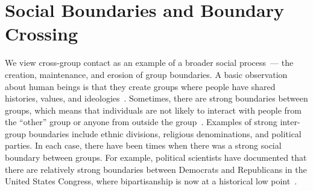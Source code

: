 \documentclass[letterpaper]{article}
\begin{document}


\section{Social Boundaries and Boundary Crossing}
We view cross-group contact as an example of a broader social process~--- the creation, maintenance, and erosion of group boundaries. A basic observation about human beings is that they create groups where people have shared histories, values, and ideologies~\cite{turner1987rediscovering}. Sometimes, there are strong boundaries between groups, which means that individuals are not likely to interact with people from the ``other'' group or anyone from outside the group~\cite{weisel2015groupconflict}. Examples of strong inter-group boundaries include ethnic divisions, religious denominations, and political parties. In each case, there have been times when there was a strong social boundary between groups. For example, political scientists have documented that there are relatively strong boundaries between Democrats and Republicans in the United States Congress, where bipartisanship is now at a historical low point~\cite{andris2015riseofpartisanship}.
\end{document}

